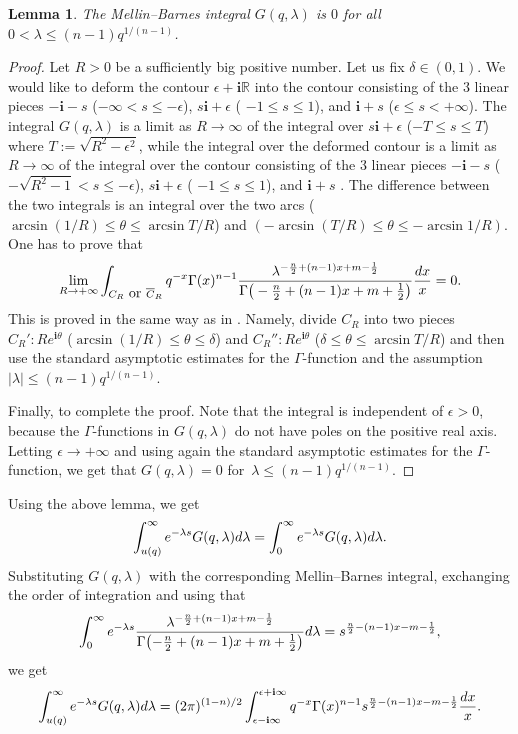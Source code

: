 \documentclass[10pt,a4paper]{article}
\numberwithin{equation}{section}
\newtheorem{Lemma}[Theorem]{Lemma}
\newcommand{\RR}{\mathbb{R}}
\newcommand{\ii}{\mathbf{i}}
\begin{document}
\begin{Lemma}\label{le:ac_G}
The Mellin--Barnes integral $G(q,\lambda)$ is $0$ for all $0<\lambda \leq (n-1) q^{1/(n-1)}$.
\end{Lemma}
\begin{proof}
Let $R>0$ be a sufficiently big positive number. Let us fix $\delta\in (0,1)$. We would like to deform the contour $\epsilon + \ii \RR$ into the contour consisting of the 3 linear pieces
$-\ii - s$ ($-\infty < s \leq -\epsilon$),
$s \ii + \epsilon$ ( $-1\leq s\leq 1$), and
$\ii + s$ ($\epsilon\leq s<+\infty$). The integral $G(q,\lambda)$ is a limit as $R\to \infty$ of the integral over $s\ii +\epsilon$ ($-T\leq s\leq T$) where $T:=\sqrt{R^2-\epsilon^2}$, while the integral over the deformed contour is a limit as $R\to \infty$ of the integral over the contour consisting of the 3 linear pieces
$-\ii - s$ ($-\sqrt{R^2-1} < s \leq -\epsilon$),
$s \ii + \epsilon$ ( $-1\leq s\leq 1$), and
$\ii + s$ . The difference between the two integrals is an integral over the two arcs
\smash{$C_R\colon R e^{\ii \theta}$} ($\arcsin(1/R)\leq \theta\leq \arcsin{T/R}$) and
\smash{$\overline{C}_R\colon R e^{\ii \theta}$} $(-\arcsin(T/R)\leq \theta\leq -\arcsin{1/R})$. One has to prove that
\[
\lim_{R\to +\infty} \int_{C_R \mbox{ or } \overline{C}_R}
q^{-x}\Gamma(x)^{n-1}
\frac{\lambda^{-\frac{n}{2}+(n-1)x+m-\frac{1}{2} } }{
\Gamma\big(-\frac{n}{2}+(n-1)x+m+\frac{1}{2} \big) }
\frac{{\rm d}x}{x} =0.
\]
This is proved in the same way as in \cite[Section 5]{DF}. Namely, divide $C_R$ into two pieces
$C_{R}'\colon R e^{\ii \theta}$ ($\arcsin(1/R)\leq \theta\leq \delta$) and
$C_{R}''\colon R e^{\ii \theta}$ ($\delta \leq \theta\leq \arcsin{T/R}$) and then use the standard asymptotic estimates for the $\Gamma$-function and the assumption $|\lambda|\leq (n-1) q^{1/(n-1)}$.

Finally, to complete the proof. Note that the integral is independent of $\epsilon>0$, because the $\Gamma$-functions in $G(q,\lambda)$ do not have poles on the positive real axis. Letting $\epsilon\to +\infty$ and using again the standard asymptotic estimates for the $\Gamma$-function, we get that $G(q,\lambda)=0$ for~${\lambda\leq (n-1) q^{1/(n-1)}}$.
\end{proof}

Using the above lemma, we get
\[
\int_{u(q)}^\infty e^{-\lambda s} G(q,\lambda) {\rm d}\lambda =
\int_{0}^\infty e^{-\lambda s} G(q,\lambda){\rm d}\lambda.
\]
Substituting $G(q,\lambda)$ with the corresponding Mellin--Barnes integral, exchanging the order of integration and using that
\[
\int_{0}^\infty e^{-\lambda s}
\frac{\lambda^{-\frac{n}{2}+(n-1)x+m-\frac{1}{2} } }{
\Gamma\bigl(-\frac{n}{2}+(n-1)x+m+\frac{1}{2} \bigr) } {\rm d}\lambda =
s^{\frac{n}{2}-(n-1)x-m-\frac{1}{2}},
\]
we get
\begin{equation}\label{LT-G}
\int_{u(q)}^\infty e^{-\lambda s} G(q,\lambda) {\rm d}\lambda =
(2\pi)^{(1-n)/2}
\int_{\epsilon -\ii\infty}^{\epsilon + \ii \infty}
q^{-x}\Gamma(x)^{n-1}
s^{\frac{n}{2}-(n-1)x-m-\frac{1}{2}}
\frac{{\rm d}x}{x}.
\end{equation}
\end{document}
